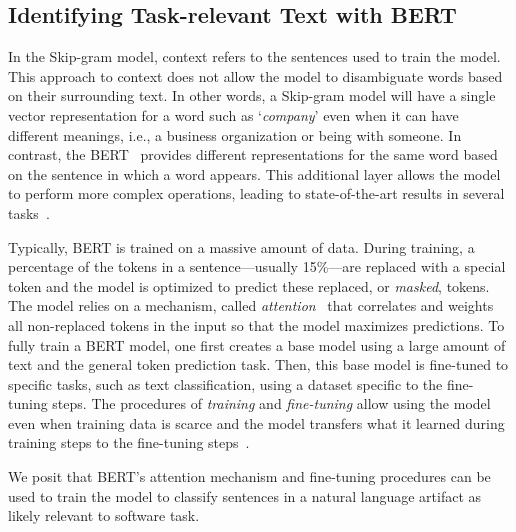     

\subsection{Identifying Task-relevant Text with BERT}
\label{cp5:approach-bert}


In the Skip-gram model, context refers to the sentences used to train the model. This approach to context  does not allow the model to disambiguate words based on their surrounding text. In other words, a Skip-gram model will have a single vector representation for a word such as `\textit{company}' even when it can have different meanings, i.e., a business organization or being with someone. In contrast, 
the \acf{BERT}~\cite{Devlin2018Bert} provides different representations for the same word based on the sentence in which a word appears.
This additional layer allows the model to perform more complex operations,
leading to state-of-the-art results in several tasks~\cite{Devlin2018Bert}. 





Typically, BERT is trained 
on a massive amount of data. During training, a percentage of the tokens in a sentence---usually 15\%---are replaced with a special token and the model is optimized to predict these replaced, or \textit{masked}, tokens. 
The model relies on a mechanism, called \textit{attention}~\cite{Vaswani2017attention} that correlates and weights all non-replaced tokens in the input so that the model maximizes predictions.
To fully train a BERT model, one first creates a base model using a large amount of text and the general token prediction task. 
Then, this base model is fine-tuned to specific tasks, such as text classification, using a dataset specific to the fine-tuning steps. The procedures of \textit{training} and \textit{fine-tuning}
allow using the model even when training data is scarce and the model transfers
what it learned during training steps to the fine-tuning steps~\cite{Devlin2018Bert}.


We posit that BERT's attention mechanism and fine-tuning procedures can be used to train the model to classify 
sentences in a natural language artifact as likely relevant to software task. 

